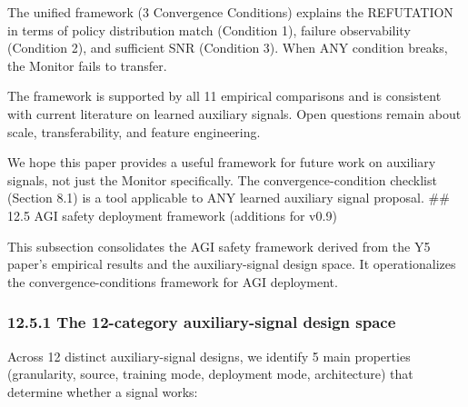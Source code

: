 \documentclass[
]{article}
\begin{document}
The unified framework (3 Convergence Conditions) explains the REFUTATION
in terms of policy distribution match (Condition 1), failure
observability (Condition 2), and sufficient SNR (Condition 3). When ANY
condition breaks, the Monitor fails to transfer.

The framework is supported by all 11 empirical comparisons and is
consistent with current literature on learned auxiliary signals. Open
questions remain about scale, transferability, and feature engineering.

We hope this paper provides a useful framework for future work on
auxiliary signals, not just the Monitor specifically. The
convergence-condition checklist (Section 8.1) is a tool applicable to
ANY learned auxiliary signal proposal. \#\# 12.5 AGI safety deployment
framework (additions for v0.9)

This subsection consolidates the AGI safety framework derived from the
Y5 paper's empirical results and the auxiliary-signal design space. It
operationalizes the convergence-conditions framework for AGI deployment.

\subsubsection{12.5.1 The 12-category auxiliary-signal design
space}\label{the-12-category-auxiliary-signal-design-space}

Across 12 distinct auxiliary-signal designs, we identify 5 main
properties (granularity, source, training mode, deployment mode,
architecture) that determine whether a signal works:
\end{document}

